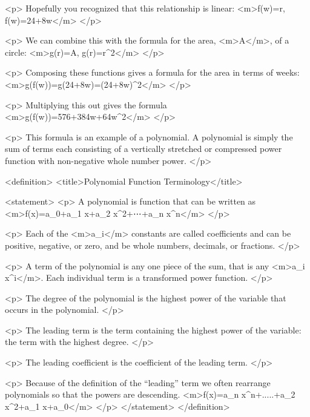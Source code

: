         <p>
            Hopefully you recognized that this relationship is linear: <m>f(w)=r, f(w)=24+8w</m>
        </p>

        <p>
            We can combine this with the formula for the area, <m>A</m>, of a circle: <m>g(r)=A, g(r)=\pi r^{2}</m>
        </p>

        <p>
            Composing these functions gives a formula for the area in terms of weeks: <m>g(f(w))=g(24+8w)=\pi(24+8w)^{2}</m>
        </p>

        <p>
            Multiplying this out gives the formula <m>g(f(w))=576\pi+384\pi w+64\pi w^{2}</m>
        </p>

        <p>
            This formula is an example of a polynomial.
            A polynomial is simply the sum of terms each consisting of a vertically stretched or compressed power function with non-negative whole number power.
        </p>

        <definition>
            <title>Polynomial Function Terminology</title>

            <statement>
                <p>
                    A polynomial is function that can be written as <m>f(x)=a_{0}+a_{1} x+a_{2} x^{2}+⋯+a_{n} x^{n}</m>
                </p>

                <p>
                    Each of the <m>a_{i}</m> constants are called coefficients and can be positive, negative, or zero, and be whole numbers, decimals, or fractions.
                </p>

                <p>
                    A term of the polynomial is any one piece of the sum, that is any <m>a_{i} x^{i}</m>.
                    Each individual term is a transformed power function.
                </p>

                <p>
                    The degree of the polynomial is the highest power of the variable that occurs in the polynomial.
                </p>

                <p>
                    The leading term is the term containing the highest power of the variable: the term with the highest degree.
                </p>

                <p>
                    The leading coefficient is the coefficient of the leading term.
                </p>

                <p>
                    Because of the definition of the “leading” term we often rearrange polynomials so that the powers are descending.
                    <m>f(x)=a_{n} x^{n}+.....+a_{2} x^{2}+a_{1} x+a_{0}</m>
                </p>
            </statement>
        </definition>

